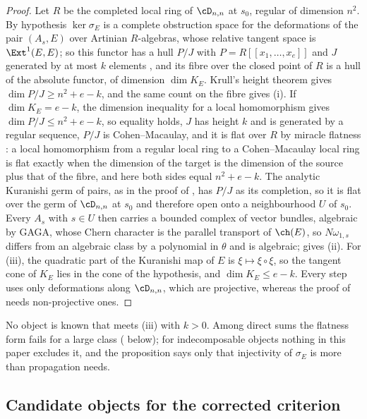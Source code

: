 \begin{proof}
Let $R$ be the completed local ring of $\cD_{n,n}$ at $s_{0}$, regular of
dimension $n^{2}$. By hypothesis $\ker\sigma_{E}$ is a complete obstruction
space for the deformations of the pair $(A_{s},E)$ over Artinian $R$-algebras,
whose relative tangent space is $\Ext^{1}(E,E)$; so this functor has a hull
$P/J$ with $P=R[[x_{1},\dots,x_{e}]]$ and $J$ generated by at most $k$
elements \cite{FM98}, and its fibre over the closed point of $R$ is a hull of
the absolute functor, of dimension $\dim K_{E}$. Krull's height theorem gives
$\dim P/J\ge n^{2}+e-k$, and the same count on the fibre gives (i). If
$\dim K_{E}=e-k$, the dimension inequality for a local homomorphism
\cite[Theorem~15.1]{Mat86} gives $\dim P/J\le n^{2}+e-k$, so equality holds, $J$
has height $k$ and is generated by a regular sequence, $P/J$ is
Cohen--Macaulay, and it is flat over $R$ by miracle flatness
\cite[Theorem~23.1]{Mat86}: a local homomorphism from a regular local ring to
a Cohen--Macaulay local ring is flat exactly when the dimension of the target
is the dimension of the source plus that of the fibre, and here both sides
equal $n^{2}+e-k$. The analytic Kuranishi germ of pairs, as in the
proof of , has $P/J$ as its completion, so it is flat over
the germ of $\cD_{n,n}$ at $s_{0}$ and therefore open onto a neighbourhood
$U$ of $s_{0}$. Every $A_{s}$ with $s\in U$ then carries a bounded complex of
vector bundles, algebraic by GAGA, whose Chern character is the parallel
transport of $\ch(E)$, so $N\omega_{1,s}$ differs from an algebraic class by a
polynomial in $\theta$ and is algebraic;  gives (ii).
For (iii), the quadratic part of the Kuranishi map of $E$ is
$\xi\mapsto\xi\circ\xi$, so the tangent cone of $K_{E}$ lies in the cone of the
hypothesis, and $\dim K_{E}\le e-k$. Every step uses only deformations along
$\cD_{n,n}$, which are projective, whereas the proof of 
needs non-projective ones.
\end{proof}

No object is known that meets (iii) with $k>0$. Among direct sums the
flatness form fails for a large class ( below); for
indecomposable objects nothing in this paper excludes it, and the proposition
says only that injectivity of $\sigma_{E}$ is more than propagation needs.

\subsection{Candidate objects for the corrected criterion}

